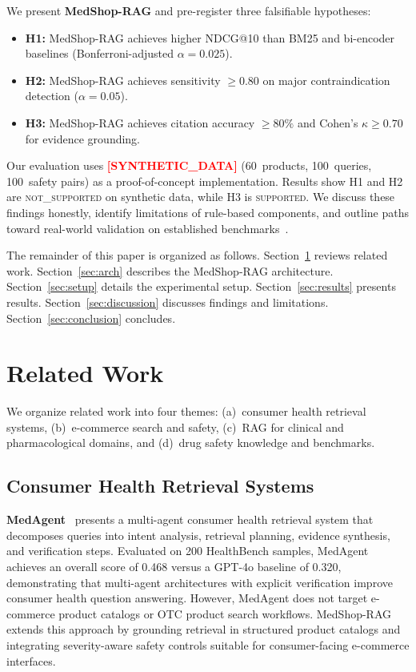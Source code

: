 \documentclass[conference]{IEEEtran}
\newcommand{\synflag}{\textcolor{red}{\textbf{[SYNTHETIC\_DATA]}}}
\begin{document}
We present \textbf{MedShop-RAG} and pre-register three falsifiable hypotheses:
\begin{itemize}
  \item \textbf{H1:} MedShop-RAG achieves higher NDCG@10 than BM25 and bi-encoder
    baselines (Bonferroni-adjusted $\alpha{=}0.025$).
  \item \textbf{H2:} MedShop-RAG achieves sensitivity $\geq 0.80$ on major
    contraindication detection ($\alpha{=}0.05$).
  \item \textbf{H3:} MedShop-RAG achieves citation accuracy $\geq 80\%$ and
    Cohen's $\kappa \geq 0.70$ for evidence grounding.
\end{itemize}

Our evaluation uses \synflag{} (60~products, 100~queries, 100~safety pairs) as
a proof-of-concept implementation. Results show H1 and H2 are
\textsc{not\_supported} on synthetic data, while H3 is \textsc{supported}. We
discuss these findings honestly, identify limitations of rule-based components,
and outline paths toward real-world validation on established
benchmarks~\cite{shoppingcomp,drugbench}.

The remainder of this paper is organized as follows. Section~\ref{sec:related}
reviews related work. Section~\ref{sec:arch} describes the MedShop-RAG
architecture. Section~\ref{sec:setup} details the experimental setup.
Section~\ref{sec:results} presents results. Section~\ref{sec:discussion}
discusses findings and limitations. Section~\ref{sec:conclusion} concludes.

\section{Related Work}
\label{sec:related}

We organize related work into four themes: (a)~consumer health retrieval
systems, (b)~e-commerce search and safety, (c)~RAG for clinical and
pharmacological domains, and (d)~drug safety knowledge and benchmarks.

\subsection{Consumer Health Retrieval Systems}

\textbf{MedAgent}~\cite{medagent} presents a multi-agent consumer health
retrieval system that decomposes queries into intent analysis, retrieval
planning, evidence synthesis, and verification steps. Evaluated on 200
HealthBench samples, MedAgent achieves an overall score of 0.468 versus a
GPT-4o baseline of 0.320, demonstrating that multi-agent architectures with
explicit verification improve consumer health question answering. However,
MedAgent does not target e-commerce product catalogs or OTC product search
workflows. MedShop-RAG extends this approach by grounding retrieval in
structured product catalogs and integrating severity-aware safety controls
suitable for consumer-facing e-commerce interfaces.
\end{document}
